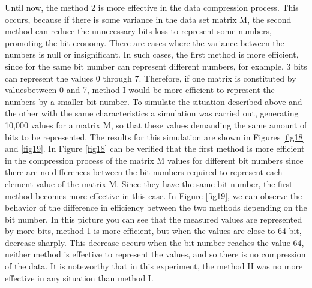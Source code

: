\documentclass[10pt]{article}
\begin{document}
Until now, the method 2 is more effective in the data compression process. This occurs, because if there is some variance in the data set matrix M, the second method can reduce the unnecessary bits loss to represent some numbers, promoting the bit economy. There are cases where the variance between the numbers is null or insignificant. In such cases, the first method is more efficient, since for the same bit number can represent different numbers, for example, 3 bits can represent the values ​​0 through 7. Therefore, if one matrix is ​​constituted by values ​​between 0 and 7,  method I would be more efficient to represent the numbers by a smaller bit number. To simulate the situation described above and the other with the same characteristics a simulation was carried out, generating 10,000 values ​​for a matrix M, so that these values ​​demanding the same amount of bits to be represented. The results for this simulation are shown in Figures \ref{fig18} and \ref{fig19}. In Figure \ref{fig18} can be verified that the first method is more efficient in the compression process of the matrix M values ​​for different bit numbers since there are no differences between the bit numbers required to represent each element value of the matrix M. Since they have the same bit number, the first method becomes more effective in this case. In Figure \ref{fig19}, we can observe the behavior of the difference in efficiency between the two methods depending on the bit number. In this picture you can see that the measured values ​​are represented by more bits, method 1 is more efficient, but when the values ​​are close to 64-bit, decrease sharply. This decrease occurs when the bit number reaches the value 64, neither method is effective to represent the values​​, and so there is no compression of the data. It is noteworthy that in this experiment, the method II was no more effective in any situation than method I. 
\end{document}
